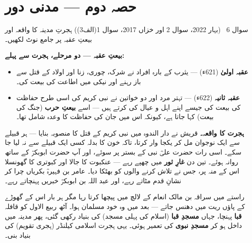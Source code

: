 
\section*{حصہ دوم --- مدنی دور}

\begin{sawal}{سوال \textenglish{6} \ \textnormal{\small(بہار \textenglish{2022}، سوال \textenglish{2} اور خزاں \textenglish{2017}، سوال \textenglish{1}(الف\textenglish{3}))}}
ہجرتِ مدینہ کا واقعہ اور بیعتِ عقبہ پر جامع نوٹ لکھیں۔
\end{sawal}

\begin{hal}
\textbf{بیعتِ عقبہ --- دو مرحلے، ہجرت سے پہلے:}
\begin{itemize}\setlength{\itemsep}{1pt}
  \item \textbf{عقبہ اولیٰ} (\textenglish{621}ء) --- یثرب کے بارہ افراد نے
        شرک، چوری، زنا اور اولاد کے قتل سے باز رہنے اور نیکی میں اطاعت کی
        بیعت کی۔
  \item \textbf{عقبہ ثانیہ} (\textenglish{622}ء) --- تہتر مرد اور دو خواتین
        نے نبی کریم \saw کی اسی طرح حفاظت کی بیعت کی جیسے اپنے اہل و عیال
        کی کرتے ہیں --- اسے \textbf{بیعتِ حرب} (جنگ کی بیعت) کہا جاتا ہے،
        کیونکہ اس میں جان کی حفاظت کا وعدہ شامل تھا۔
\end{itemize}

\medskip
\textbf{ہجرت کا واقعہ۔} قریش نے دار الندوہ میں نبی کریم \saw کے قتل کا
منصوبہ بنایا --- ہر قبیلے سے ایک نوجوان مل کر یکجا وار کرتا، تاکہ خون کا
بدلہ کسی ایک قبیلے سے نہ لیا جا سکے۔ اسی رات حضرت علیؓ نبی \saw کے بستر پر
سوئے، اور آپ \saw حضرت ابوبکرؓ کے ساتھ روانہ ہوئے۔ تین دن \textbf{غارِ ثور}
میں چھپے رہے --- عنکبوت کا جالا اور کبوتری کا گھونسلا اس کے منہ پر، جس نے
تلاش کرنے والوں کو بھٹکا دیا۔ عامر بن فہیرہؓ بکریاں چرا کر نشانِ قدم مٹاتے
رہے، اور عبد اللہ بن ابوبکرؓ خبریں پہنچاتے رہے۔

\medskip
راستے میں سراقہ بن مالک انعام کے لالچ میں پیچھا کرتا رہا مگر ہر بار اس کے
گھوڑے کے پاؤں ریت میں دھنس جاتے --- بعد میں وہ خود مسلمان ہوا۔ آٹھ ربیع
الاول کو قافلہ \textbf{قبا} پہنچا، جہاں \textbf{مسجدِ قبا} (اسلام کی پہلی
مسجد) کی بنیاد رکھی گئی، پھر مدینہ میں داخل ہو کر \textbf{مسجدِ نبوی} کی
تعمیر ہوئی۔ یہی ہجرت اسلامی کیلنڈر (ہجری تقویم) کی بنیاد بنی۔
\end{hal}

